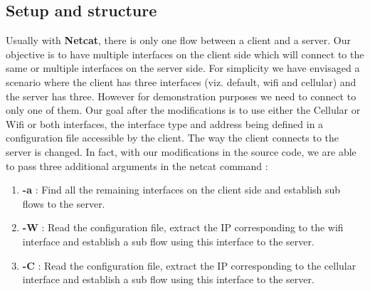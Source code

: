 \documentclass[a4paper,11pt]{article}
\begin{document}
		\subsection{Setup and structure}
			\label{subsec:setup}
			Usually with \textbf{Netcat}, there is only one flow between a client and a server. Our objective is to have multiple interfaces on the client side which will connect to the same or multiple interfaces on the server side. For simplicity we have envisaged a scenario where the client has three interfaces (viz. default, wifi and cellular) and the server has three. However for demonstration purposes we need to connect to only one of them. Our goal after the modifications is to use either the Cellular or Wifi or both interfaces, the interface type and address being defined in a configuration file accessible by the client. The way the client connects to the server is changed. In fact, with our modifications in the source code, we are able to pass three additional arguments in the netcat command :

			\begin{enumerate}
				\item \textbf{-a} : Find all the remaining interfaces on the client side and establish sub flows to the server.
				\item \textbf{-W} : Read the configuration file, extract the IP corresponding to the wifi interface and establish a sub flow using this interface to the server.
				\item \textbf{-C} : Read the configuration file, extract the IP corresponding to the cellular interface and establish a sub flow using this interface to the server.
			\end{enumerate}
\end{document}
